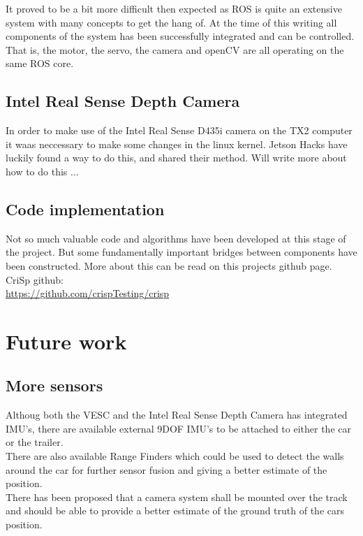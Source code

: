 \documentclass{article}
\begin{document}
It proved to be a bit more difficult then expected as ROS is quite an extensive system with many concepts to get the hang of. At the time of this writing all components of the system has been successfully integrated and can be controlled. That is, the motor, the servo, the camera and openCV are all operating on the same ROS core.


	\subsection{Intel Real Sense Depth Camera}
		In order to make use of the Intel Real Sense D435i camera on the TX2 computer it waas neccessary to make some changes in the linux kernel. Jetson Hacks have luckily found a way to do this, and shared their method. Will write more about how to do this ...

	
	\subsection{Code implementation}
		Not so much valuable code and algorithms have been developed at this stage of the project. But some fundamentally important bridges between components have been constructed. More about this can be read on this projects github page. \\
	
		CriSp github: \\
		\url{https://github.com/crispTesting/crisp}

	
\section{Future work}

	\subsection{More sensors}
		Althoug both the VESC and the Intel Real Sense Depth Camera has integrated IMU's, there are available external 9DOF IMU's to be attached to either the car or the trailer. \\

		There are also available Range Finders which could be used to detect the walls around the car for further sensor fusion and giving a better estimate of the position. \\

		There has been proposed that a camera system shall be mounted over the track and should be able to provide a better estimate of the ground truth of the cars position.
\end{document}
